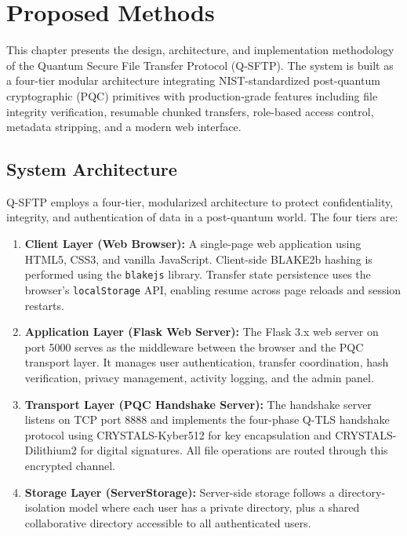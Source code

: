 \chapter{Proposed Methods}
\label{chap.4}

This chapter presents the design, architecture, and implementation methodology of the Quantum Secure File Transfer Protocol (Q-SFTP). The system is built as a four-tier modular architecture integrating NIST-standardized post-quantum cryptographic (PQC) primitives with production-grade features including file integrity verification, resumable chunked transfers, role-based access control, metadata stripping, and a modern web interface.

\section{System Architecture}

Q-SFTP employs a four-tier, modularized architecture to protect confidentiality, integrity, and authentication of data in a post-quantum world. The four tiers are:

\begin{enumerate}
    \item \textbf{Client Layer (Web Browser):} A single-page web application using HTML5, CSS3, and vanilla JavaScript. Client-side BLAKE2b hashing is performed using the \texttt{blakejs} library. Transfer state persistence uses the browser's \texttt{localStorage} API, enabling resume across page reloads and session restarts.
    
    \item \textbf{Application Layer (Flask Web Server):} The Flask 3.x web server on port 5000 serves as the middleware between the browser and the PQC transport layer. It manages user authentication, transfer coordination, hash verification, privacy management, activity logging, and the admin panel.
    
    \item \textbf{Transport Layer (PQC Handshake Server):} The handshake server listens on TCP port 8888 and implements the four-phase Q-TLS handshake protocol using CRYSTALS-Kyber512 for key encapsulation and CRYSTALS-Dilithium2 for digital signatures. All file operations are routed through this encrypted channel.
    
    \item \textbf{Storage Layer (ServerStorage):} Server-side storage follows a directory-isolation model where each user has a private directory, plus a shared collaborative directory accessible to all authenticated users.
\end{enumerate}

